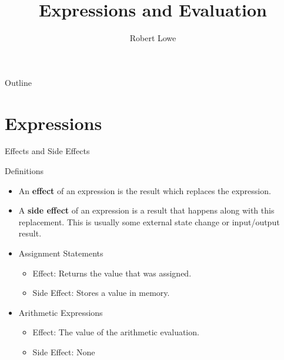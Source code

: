 \documentclass[handout]{beamer}
\title{Expressions and Evaluation}
\author{Robert Lowe}
\institute[Southeast Missouri State University] %
{
  Department of Computer Science\\
  Southeast Missouri State University
}
\date[]{}
\begin{document}
\begin{frame}
  \titlepage
\end{frame}

\begin{frame}{Outline}
  \tableofcontents
\end{frame}





\section{Expressions}
\begin{frame}{Effects and Side Effects}
    \begin{block}{Definitions}
        \begin{itemize} 
            \item An \textbf{effect} of an expression is the result which replaces the expression.
            \item A \textbf{side effect} of an expression is a result that happens along with this replacement. This is usually some external state change or input/output result.
        \end{itemize}
    \end{block}
    \begin{itemize}
        \item Assignment Statements
        \begin{itemize}
            \item Effect: Returns the value that was assigned.
            \item Side Effect: Stores a value in memory.
        \end{itemize}
        \item Arithmetic Expressions
        \begin{itemize}
            \item Effect: The value of the arithmetic evaluation.
            \item Side Effect: None
        \end{itemize}
    \end{itemize}
\end{frame}
\end{document}
